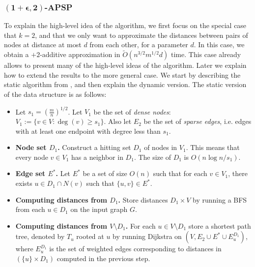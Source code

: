 \subsubsection{\texorpdfstring{$\mathbf{(1+\epsilon,2)}$}{(1+epsilon)}-APSP}
To explain the high-level idea of the algorithm, we first focus on the special case that $k=2$, and that we only want to approximate the distances between pairs of nodes at distance at most $d$ from each other, for a parameter $d$. In this case, we obtain a $+2$-additive approximation in $\tilde{O}(n^{3/2}m^{1/2} d )$ time. This case already allows to present many of the high-level ideas of the algorithm. Later we explain how to extend the results to the more general case.
 We start by describing the static algorithm from \cite{DHZ00}, and then explain the dynamic version. 
The static version of the data structure is as follows:

\begin{itemize}
    \setlength\itemsep{0em}
    \item Let $s_1= (\frac{m}{n})^{1/2}$. Let $V_1$ be the set of \textit{dense nodes}: $V_1:= \{ v \in V: \deg(v) \geq s_1\}$. Also let $E_2$ be the set of \textit{sparse edges}, i.e. edges with at least one endpoint with degree less than $s_1$.
    \item \textbf{Node set $D_1$.} Construct a hitting set $D_1$ of nodes in $V_1$. %
    This means that every node $v \in V_1$ has a neighbor in $D_1$. The size of $D_1$ is $O(n \log{n}/s_1)$.
    \item \textbf{Edge set $E^*$.} Let $E^*$ be a set of size $O(n)$ such that for each $v \in V_1$, there exists $u \in D_1 \cap N(v)$ such that $\{u,v\} \in E^*$.
    \item \textbf{Computing distances from $D_1$.} Store distances $D_1 \times V$ by running a BFS from each $u \in D_1$ on the input graph $G$. 
    \item \textbf{Computing distances from $V \setminus D_1$. } For each $u \in V \setminus D_1$ store a shortest path tree, denoted by $T_u$  rooted at $u$ by running Dijkstra on $(V, E_2 \cup E^* \cup E^{D_1}_u)$, where $E^{D_1}_u$ is the set of weighted edges corresponding to distances in $(\{u\} \times D_1)$ computed in the previous step. 
\end{itemize}

